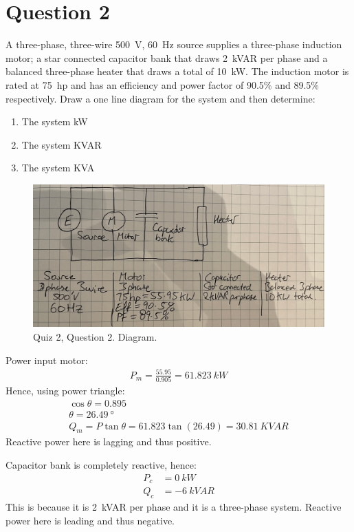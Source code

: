 \section{Question 2}
A three-phase, three-wire \SI{500}{\volt}, \SI{60}{\hertz} source supplies a three-phase induction motor; a star connected capacitor bank that draws \SI{2}{kVAR} per phase and a balanced three-phase heater that draws a total of \SI{10}{\kilo\watt}. The induction motor is rated at \SI{75}{hp} and has an efficiency and power factor of 90.5\% and 89.5\% respectively. Draw a one line diagram for the system and then determine:
\begin{enumerate}
    \item The system kW
    \item The system KVAR
    \item The system KVA
\end{enumerate}
\begin{figure}[H]
    \centering
    \includegraphics[width = \textwidth]{img/figure151.jpg}
    \caption{Quiz 2, Question 2. Diagram.}
\end{figure}
Power input motor:
\begin{gather}
    P_{m} = \frac{55.95}{0.905} = \SI{61.823}{kW}
\end{gather}
Hence, using power triangle:
\begin{gather}
    \cos\theta = 0.895\\
    \theta = \SI{26.49}{\degree}\\
    Q_{m} = P\tan\theta = 61.823\tan\left(26.49\right) = \SI{30.81}{KVAR}
\end{gather}
Reactive power here is lagging and thus positive.

Capacitor bank is completely reactive, hence:
\begin{align}
    P_{c} & = \SI{0}{kW}    \\
    Q_{c} & = \SI{-6}{kVAR}
\end{align}
This is because it is \SI{2}{kVAR} per phase and it is a three-phase system. Reactive power here is leading and thus negative.

